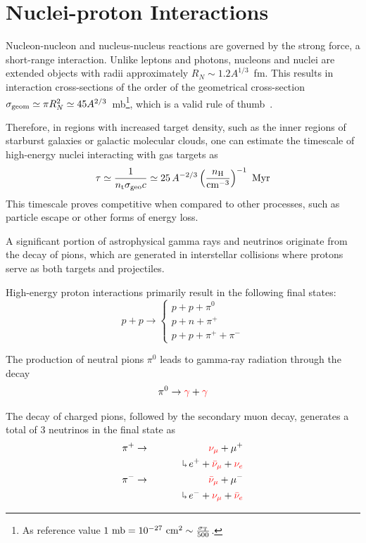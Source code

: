 \section{Nuclei-proton Interactions}

Nucleon-nucleon and nucleus-nucleus reactions are governed by the strong force, a short-range interaction. Unlike leptons and photons, nucleons and nuclei are extended objects with radii approximately $R_N \sim 1.2 A^{1/3}$~fm. This results in interaction cross-sections of the order of the geometrical cross-section $\sigma_{\rm geom} \simeq \pi R_N^2 \simeq 45 A^{2/3}$~mb\footnote{As reference value $1~\text{mb} = 10^{-27}~\text{cm}^2 \sim \frac{\sigma_{\rm T}}{500}$.}, which is a valid rule of thumb~\cite{Letaw1983apjs}.

Therefore, in regions with increased target density, such as the inner regions of starburst galaxies or galactic molecular clouds, one can estimate the timescale of high-energy nuclei interacting with gas targets as
%
\[
\tau \simeq \frac{1}{n_{\rm t} \sigma_{\rm geo} c} \simeq 25 \, A^{-2/3} \left( \frac{n_{\rm H}}{\text{cm}^{-3}} \right)^{-1}~\text{Myr}
\]
%
This timescale proves competitive when compared to other processes, such as particle escape or other forms of energy loss.

A significant portion of astrophysical gamma rays and neutrinos originate from the decay of pions, which are generated in interstellar collisions where protons serve as both targets and projectiles.

High-energy proton interactions primarily result in the following final states:
%
\[
p + p \rightarrow 
\begin{cases}
p + p + \pi^0 \\
p + n + \pi^+ \\
p + p + \pi^+ + \pi^- 
\end{cases}
\]

The production of neutral pions $\pi^0$ leads to gamma-ray radiation through the decay 
%
\[ 
\pi^0 \rightarrow {\color{red}\gamma} + {\color{red}\gamma} 
\]

The decay of charged pions, followed by the secondary muon decay, generates a total of 3 neutrinos in the final state as 
%
\begin{eqnarray*}
\pi^+ & \rightarrow & {\color{red}\nu_\mu} + \mu^+ \\
& & \hphantom{\nu_\mu + l} \drsh \, e^+ + {\color{red}\bar \nu_\mu} + {\color{red}\nu_e} \\
\pi^- & \rightarrow & {\color{red}\bar \nu_\mu} + \mu^- \\
& &  \hphantom{\bar \nu_\mu + l} \drsh \, e^- + {\color{red}\nu_\mu} + {\color{red}\bar \nu_e} 
\end{eqnarray*}

